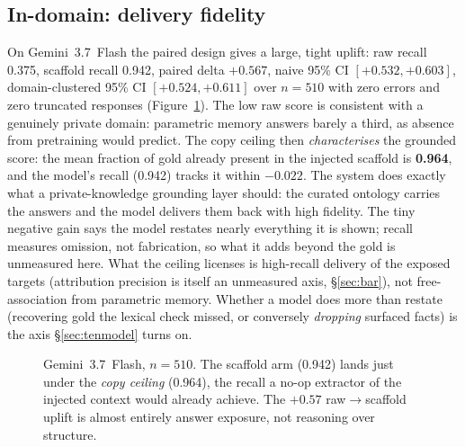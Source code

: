 \documentclass[10pt,twocolumn]{article}
\begin{document}
\subsection{In-domain: delivery fidelity}\label{sec:indomain}
On Gemini~3.7~Flash the paired design gives a large, tight uplift: raw recall 0.375, scaffold recall
0.942, paired delta $\mathbf{+0.567}$, naive 95\% CI $[+0.532,+0.603]$, domain-clustered 95\% CI
$[+0.524,+0.611]$ over $n=510$ with zero errors and zero truncated responses (Figure~\ref{fig:anchor}).
The low raw score is consistent with a genuinely private domain: parametric memory answers barely a
third, as absence from pretraining would predict. The copy
ceiling then \emph{characterises} the grounded score: the mean fraction of gold already present in
the injected scaffold is \textbf{0.964}, and the model's recall (0.942) tracks it within $-0.022$.
The system does exactly what a private-knowledge grounding layer should: the curated ontology carries
the answers and the model delivers them back with high fidelity. The tiny negative gain says the
model restates nearly everything it is shown; recall measures omission, not fabrication, so what it
adds beyond the gold is unmeasured here. What the ceiling licenses is high-recall delivery of the
exposed targets (attribution precision is itself an unmeasured axis, \S\ref{sec:bar}), not
free-association from parametric memory. Whether a model does more than
restate (recovering gold the lexical check missed, or conversely \emph{dropping} surfaced
facts) is the axis \S\ref{sec:tenmodel} turns on.

\begin{figure}[t]\centering
{}
\caption{Gemini~3.7~Flash, $n=510$. The scaffold arm (0.942) lands just under the \emph{copy ceiling}
(0.964), the recall a no-op extractor of the injected context would already achieve. The $+0.57$
raw$\to$scaffold uplift is almost entirely answer exposure, not reasoning over structure.}
\label{fig:anchor}
\end{figure}
\end{document}
